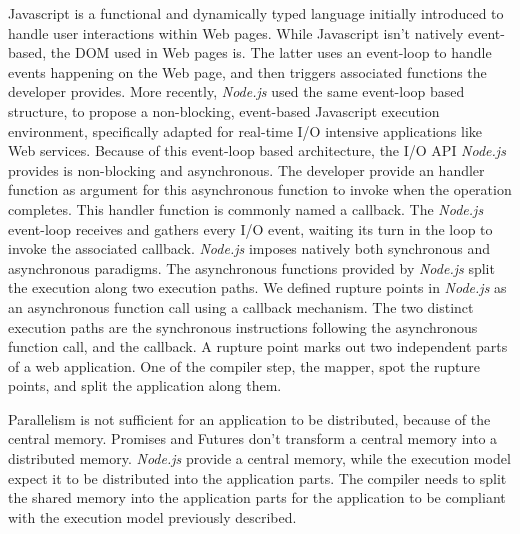 Javascript is a functional and dynamically typed language initially introduced to handle user interactions within Web pages.
While Javascript isn't natively event-based, the DOM used in Web pages is.
The latter uses an event-loop to handle events happening on the Web page, and then triggers associated functions the developer provides.
More recently, \textit{Node.js} used the same event-loop based structure, to propose a non-blocking, event-based Javascript execution environment, specifically adapted for real-time I/O intensive applications like Web services.
Because of this event-loop based architecture, the I/O API \textit{Node.js} provides is non-blocking and asynchronous.
The developer provide an handler function as argument for this asynchronous function to invoke when the operation completes.
This handler function is commonly named a callback.%
The \textit{Node.js} event-loop receives and gathers every I/O event, waiting its turn in the loop to invoke the associated callback.
\textit{Node.js} imposes natively both synchronous and asynchronous paradigms.
The asynchronous functions provided by \textit{Node.js} split the execution along two execution paths.
We defined rupture points in \textit{Node.js} as an asynchronous function call using a callback mechanism.
The two distinct execution paths are the synchronous instructions following the asynchronous function call, and the callback.
A rupture point marks out two independent parts of a web application.
One of the compiler step, the mapper, spot the rupture points, and split the application along them.

Parallelism is not sufficient for an application to be distributed, because of the central memory.
Promises and Futures don't transform a central memory into a distributed memory.
\textit{Node.js} provide a central memory, while the execution model expect it to be distributed into the application parts.
The compiler needs to split the shared memory into the application parts for the application to be compliant with the execution model previously described.

